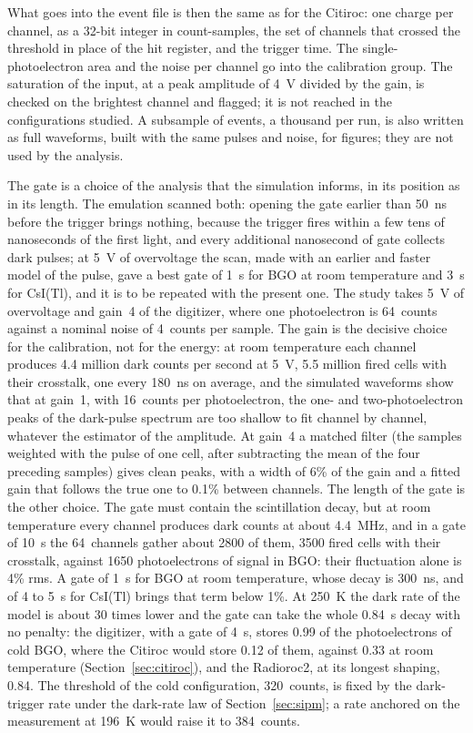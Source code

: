 \documentclass[11pt]{article}
\newcommand{\us}{\textmu s\xspace}
\newcommand{\csitl}{CsI(Tl)\xspace}
\begin{document}
What goes into the event file is then the same as for the Citiroc: one
charge per channel, as a 32-bit integer in count-samples, the set of
channels that crossed the threshold in place of the hit register, and the
trigger time. The single-photoelectron area and the noise per channel go
into the calibration group. The saturation of the input, at a peak
amplitude of 4~V divided by the gain, is checked on the brightest channel
and flagged; it is not reached in the configurations studied. A subsample
of events, a thousand per run, is also written as full waveforms, built with
the same pulses and noise, for figures; they are not used by the analysis.

The gate is a choice of the analysis that the simulation informs, in its
position as in its length. The emulation scanned both: opening the gate
earlier than 50~ns before the trigger brings nothing, because the trigger
fires within a few tens of nanoseconds of the first light, and every
additional nanosecond of gate collects dark pulses; at 5~V of overvoltage
the scan, made with an earlier and faster model of the pulse, gave a best
gate of 1~\us for BGO at room temperature and 3~\us for \csitl, and it is
to be repeated with the present one. The
study takes 5~V of overvoltage and gain~4 of the digitizer, where
one photoelectron is 64~counts against a nominal noise of 4~counts per
sample. The gain is the decisive choice for the calibration, not for the
energy: at room temperature each channel produces 4.4 million dark
counts per second at 5~V, 5.5 million fired cells with their crosstalk,
one every 180~ns on average, and the simulated waveforms show that at gain~1, with
16~counts per photoelectron, the one- and two-photoelectron peaks of the
dark-pulse spectrum are too shallow to fit channel by channel, whatever
the estimator of the amplitude. At gain~4 a matched filter (the samples
weighted with the pulse of one cell, after subtracting the mean of the
four preceding samples) gives clean peaks, with a width of 6\% of the
gain and a fitted gain that follows the true one to 0.1\% between
channels. The length of the gate is the other choice. The gate must contain the scintillation decay, but at room
temperature every channel produces dark counts at about 4.4~MHz, and in a
gate of 10~\us the 64~channels gather about 2800 of them, 3500 fired cells
with their crosstalk, against 1650 photoelectrons of signal in BGO: their
fluctuation alone is 4\% rms. A gate of 1~\us for
BGO at room temperature, whose decay is 300~ns, and of 4 to 5~\us for \csitl brings
that term below 1\%. At 250~K the dark rate of the model is about 30 times
lower and the gate can take the whole 0.84~\us decay with no penalty: the
digitizer, with a gate of 4~\us, stores 0.99 of the photoelectrons of cold
BGO, where the Citiroc would store 0.12 of them, against 0.33 at room
temperature (Section~\ref{sec:citiroc}), and the Radioroc2, at its longest
shaping, 0.84. The threshold of the cold configuration, 320~counts, is
fixed by the dark-trigger rate under the dark-rate law of
Section~\ref{sec:sipm}; a rate anchored on the measurement at 196~K would
raise it to 384~counts.
\end{document}
